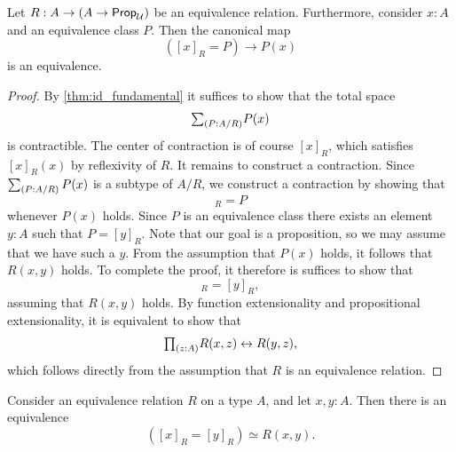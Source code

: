 \begin{prp}\label{prp:eq-quotient}
  Let $R:A\to (A\to\mathsf{Prop}_{\mathcal{U}})$ be an equivalence relation. Furthermore, consider $x:A$ and an equivalence class $P$. Then the canonical map
  \begin{equation*}
    ([x]_R=P)\to P(x)
  \end{equation*}
  is an equivalence.
\end{prp}

\begin{proof}
  By \cref{thm:id_fundamental} it suffices to show that the total space
  \begin{equation*}
    \sm{P:A/R}P(x)
  \end{equation*}
  is contractible. The center of contraction is of course $[x]_R$, which satisfies $[x]_R(x)$ by reflexivity of $R$. It remains to construct a contraction. Since $\sm{P:A/R}P(x)$ is a subtype of $A/R$, we construct a contraction by showing that
  \begin{equation*}
    [x]_R=P
  \end{equation*}
  whenever $P(x)$ holds. Since $P$ is an equivalence class there exists an element $y:A$ such that $P=[y]_R$. Note that our goal is a proposition, so we may assume that we have such a $y$. From the assumption that $P(x)$ holds, it follows that $R(x,y)$ holds. To complete the proof, it therefore is suffices to show that
  \begin{equation*}
    [x]_R=[y]_R,
  \end{equation*}
  assuming that $R(x,y)$ holds. By function extensionality and propositional extensionality, it is equivalent to show that
  \begin{equation*}
    \prd{z:A}R(x,z)\leftrightarrow R(y,z),
  \end{equation*}
  which follows directly from the assumption that $R$ is an equivalence relation.
\end{proof}

\begin{cor}\label{cor:eq-quotient}
  Consider an equivalence relation $R$ on a type $A$, and let $x,y:A$. Then there is an equivalence
  \begin{equation*}
    ([x]_R=[y]_R)\simeq R(x,y).
  \end{equation*}
\end{cor}

